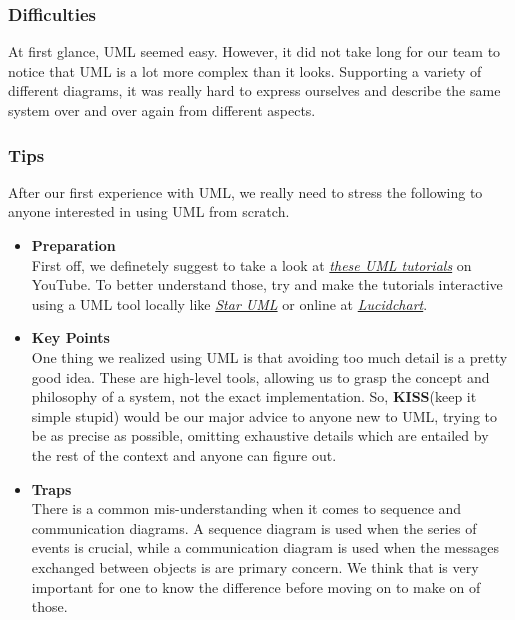 \documentclass{article}
\begin{document}
\subsubsection{Difficulties}
At first glance, UML seemed easy. However, it did not take long for our team to notice that UML is a lot more
complex than it looks. Supporting a variety of different diagrams, it was really hard to
express ourselves and describe the same system over and over again from different aspects. 

\subsubsection{Tips}
After our first experience with UML, we really need to stress the following to anyone interested in
using UML from scratch.  
\begin{itemize}
\item \textbf{Preparation} \\
	First off, we definetely suggest to take a look at 
	\href{https://www.youtube.com/watch?v=UI6lqHOVHic&list=PLUoebdZqEHTxNC7hWPPwLsBmWI0KEhZOd}{\emph{these UML tutorials}} on 			YouTube. To better understand those, try and make the tutorials interactive using a UML tool locally like 
    \href{http://staruml.io/download}{\emph {Star UML}} or online at 
    \href{https://www.lucidchart.com/pages/home}{\emph {Lucidchart}}.  

\item \textbf{Key Points}\\
One thing we realized using UML is that avoiding too much detail is a
pretty good idea. These are high-level tools, allowing us to grasp the concept and philosophy of a system, not
the exact implementation. So, \textbf{KISS}(keep it simple stupid) would be our major advice to anyone new to UML,
trying to be as precise as possible, omitting exhaustive details which are entailed by the rest of the context
and anyone can figure out. 

\item \textbf{Traps}\\
There is a common mis-understanding
when it comes to sequence and communication diagrams.
A sequence diagram is used when the series of events is crucial, while a communication
diagram is used when the messages exchanged between objects is are primary concern.
We think that is very important for one to know the difference before moving on to make on of those.

\end{itemize}
\end{document}

